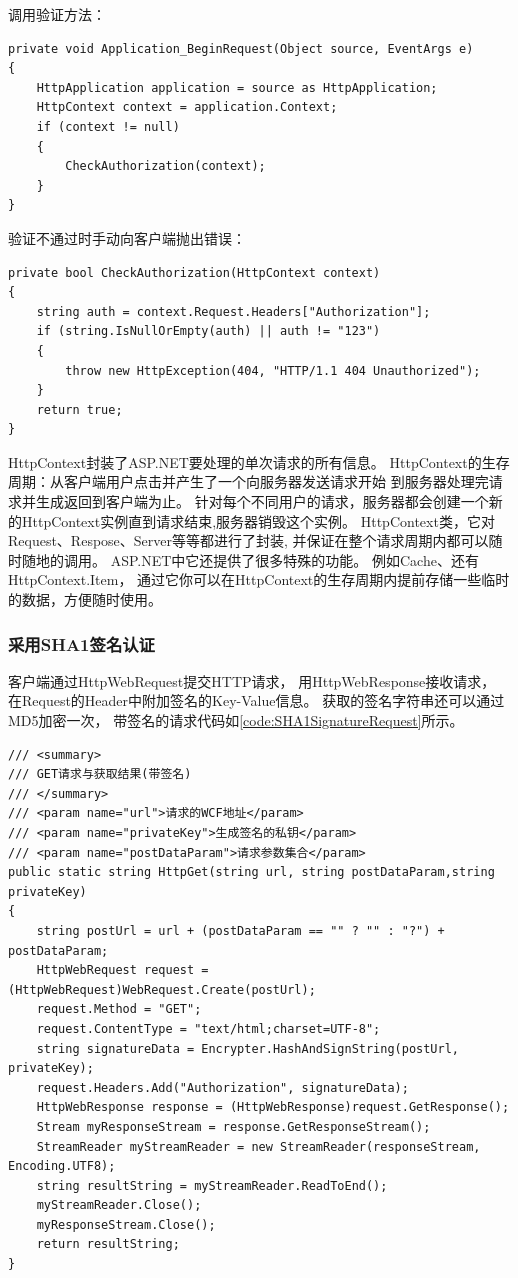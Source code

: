 \documentclass{book}
\begin{document}
调用验证方法：

\begin{lstlisting}[language={[Sharp]C}]
private void Application_BeginRequest(Object source, EventArgs e)
{
    HttpApplication application = source as HttpApplication;
    HttpContext context = application.Context;
    if (context != null)
    {
        CheckAuthorization(context);
    }           
}
\end{lstlisting}

验证不通过时手动向客户端抛出错误：

\begin{lstlisting}[language={[Sharp]C}]
private bool CheckAuthorization(HttpContext context)
{
    string auth = context.Request.Headers["Authorization"];            
    if (string.IsNullOrEmpty(auth) || auth != "123")
    { 
        throw new HttpException(404, "HTTP/1.1 404 Unauthorized");                              
    }
    return true;
}
\end{lstlisting}

HttpContext封装了ASP.NET要处理的单次请求的所有信息。
HttpContext的生存周期：从客户端用户点击并产生了一个向服务器发送请求开始
到服务器处理完请求并生成返回到客户端为止。
针对每个不同用户的请求，服务器都会创建一个新的HttpContext实例直到请求结束,服务器销毁这个实例。
HttpContext类，它对Request、Respose、Server等等都进行了封装,
并保证在整个请求周期内都可以随时随地的调用。
ASP.NET中它还提供了很多特殊的功能。
例如Cache、还有HttpContext.Item，
通过它你可以在HttpContext的生存周期内提前存储一些临时的数据，方便随时使用。

\subsubsection{采用SHA1签名认证}

客户端通过HttpWebRequest提交HTTP请求，
用HttpWebResponse接收请求，
在Request的Header中附加签名的Key-Value信息。
获取的签名字符串还可以通过MD5加密一次，
带签名的请求代码如\ref{code:SHA1SignatureRequest}所示。

\begin{lstlisting}[language={[Sharp]C},caption=客户端请求WCF接口,label={code:SHA1SignatureRequest}]
/// <summary>  
/// GET请求与获取结果(带签名)  
/// </summary>  
/// <param name="url">请求的WCF地址</param>
/// <param name="privateKey">生成签名的私钥</param>
/// <param name="postDataParam">请求参数集合</param>
public static string HttpGet(string url, string postDataParam,string privateKey)
{
    string postUrl = url + (postDataParam == "" ? "" : "?") + postDataParam;
    HttpWebRequest request = (HttpWebRequest)WebRequest.Create(postUrl);
    request.Method = "GET";
    request.ContentType = "text/html;charset=UTF-8";
    string signatureData = Encrypter.HashAndSignString(postUrl, privateKey);
    request.Headers.Add("Authorization", signatureData);
    HttpWebResponse response = (HttpWebResponse)request.GetResponse();
    Stream myResponseStream = response.GetResponseStream();
    StreamReader myStreamReader = new StreamReader(responseStream, Encoding.UTF8);
    string resultString = myStreamReader.ReadToEnd();
    myStreamReader.Close();
    myResponseStream.Close();
    return resultString;
}
\end{lstlisting}
\end{document}
